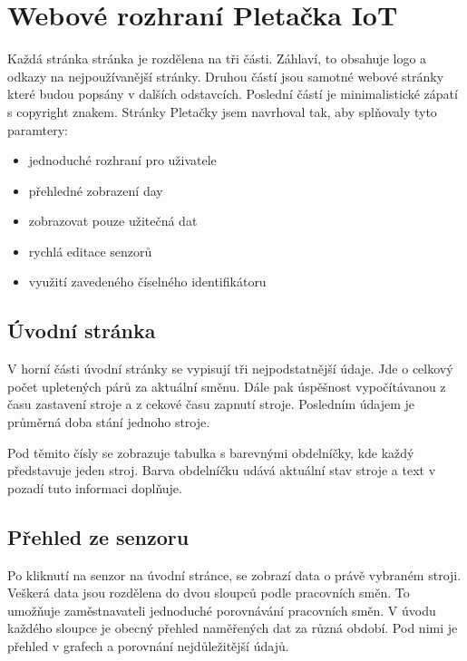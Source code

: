 \section{Webové rozhraní Pletačka IoT}
Každá stránka stránka je rozdělena na tři části. Záhlaví, to obsahuje logo a odkazy na nejpoužívanější stránky.
Druhou částí jsou samotné webové stránky které budou popsány v dalších odstavcích.
Poslední částí je minimalistické zápatí s copyright znakem.\newline
Stránky Pletačky jsem navrhoval tak, aby splňovaly tyto paramtery:

\fxnote[author=JA]{\textcolor{mygreen}{Doplňit obrázky stránek pod kapitolu nebo jeden list s fotkama}}

\begin{itemize}
    \item jednoduché rozhraní pro uživatele
    \item přehledné zobrazení day
    \item zobrazovat pouze užitečná dat
    \item rychlá editace senzorů
    \item využití zavedeného číselného identifikátoru 
\end{itemize}

\subsection{Úvodní stránka}
V horní části úvodní stránky se vypisují tři nejpodstatnější údaje.
Jde o celkový počet upletených párů za aktuální směnu.
Dále pak úspěšnost vypočítávanou z času zastavení stroje a z cekové času zapnutí stroje.
Posledním údajem je průměrná doba stání jednoho stroje.   

Pod těmito čísly se zobrazuje tabulka s barevnými obdelníčky, kde každý představuje jeden stroj.
Barva obdelníčku udává aktuální stav stroje a text v pozadí tuto informaci doplňuje. 

\subsection{Přehled ze senzoru}
Po kliknutí na senzor na úvodní stránce, se zobrazí data o právě vybraném stroji.
Veškerá data jsou rozdělena do dvou sloupců podle pracovních směn.
To umožňuje zaměstnavateli jednoduché porovnávání pracovních směn.
V úvodu každého sloupce je obecný přehled naměřených dat za různá období.
Pod nimi je přehled v grafech a porovnání nejdůležitější údajů.

